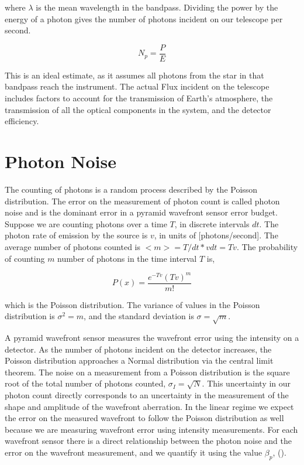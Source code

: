 where $\lambda$ is the mean wavelength in the bandpass. Dividing the power by the energy of a photon gives the number of photons incident on our telescope per second.

\begin{equation}
    N_p=\frac{P}{E}
\end{equation}

This is an ideal estimate, as it assumes all photons from the star in that bandpass reach the instrument. The actual Flux incident on the telescope includes factors to account for the transmission of Earth's atmosphere, the transmission of all the optical components in the system, and the detector efficiency. 


\section{Photon Noise}

The counting of photons is a random process described by the Poisson distribution. The error on the measurement of photon count is called photon noise and is the dominant error in a pyramid wavefront sensor error budget. Suppose we are counting photons over a time $T$, in discrete intervals $dt$. The photon rate of emission by the source is $v$, in units of [photons/second]. The average number of photons counted is $<m>=T/dt * vdt=Tv$. The probability of counting $m$ number of photons in the time interval $T$ is,

\begin{equation}
    P(x)=\frac{e^{-Tv} (Tv)^m}{m!}
\end{equation}

\noindent which is the Poisson distribution. The variance of values in the Poisson distribution is $\sigma^2=m$, and the standard deviation is $\sigma=\sqrt{m}$. 

A pyramid wavefront sensor measures the wavefront error using the intensity on a detector. As the number of photons incident on the detector increases, the Poisson distribution approaches a Normal distribution via the central limit theorem. The noise on a measurement from a Poisson distribution is the square root of the total number of photons counted, $\sigma_I=\sqrt{N}.$ This uncertainty in our photon count directly corresponds to an uncertainty in the measurement of the shape and amplitude of the wavefront aberration. In the linear regime we expect the error on the measured wavefront to follow the Poisson distribution as well because we are measuring wavefront error using intensity measurements. For each wavefront sensor there is a direct relationship between the photon noise and the error on the wavefront measurement, and we quantify it using the value $\beta_p $, (\citep{guyon2005}).

